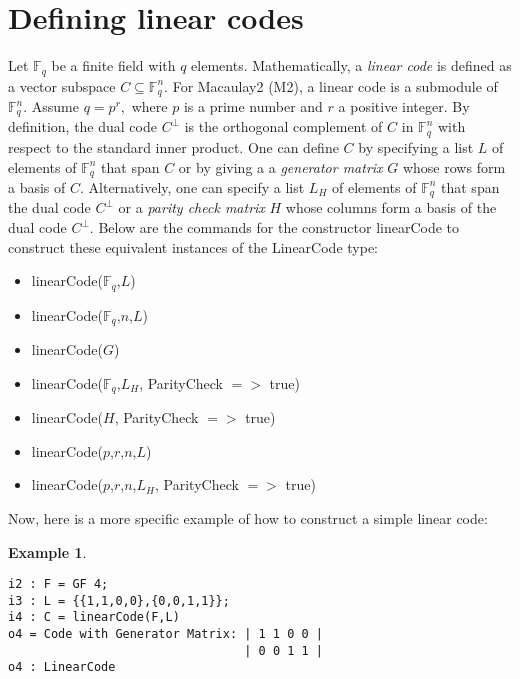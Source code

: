\documentclass[12pt]{amsart}
\theoremstyle{plain}
\newtheorem{example}[theorem]{Example}
\begin{document}
\section{Defining linear codes}\label{def}
Let $\mathbb{F}_q$ be a finite field with $q$ elements. Mathematically, a {\it linear code} is defined as a vector subspace $C\subseteq \mathbb{F}_q^n.$ For Macaulay2 (M2), a linear code is a submodule of $\mathbb{F}_q^n.$ Assume $q=p^r,$ where $p$ is a prime number and $r$ a positive integer. By definition, the dual code $C^\perp$ is the orthogonal complement of $C$ in $\mathbb{F}_q^n$ with respect to the standard inner product. One can define $C$ by specifying a list $L$ of elements of $\mathbb{F}_q^n$ that span $C$ or by giving a
a {\it generator matrix} $G$ whose rows form a basis of $C$. Alternatively, one can specify a list $L_{H}$ of elements of $\mathbb{F}_q^n$ that span the dual  code $C^\perp$ or a {\it parity check matrix} $H$ whose columns form a basis of the dual code $C^\perp$.
Below are the commands for the constructor linearCode to construct these equivalent instances of the LinearCode type:
\begin{itemize}
\item linearCode($\mathbb{F}_q$,$L$)
\item linearCode($\mathbb{F}_q$,$n$,$L$)
\item linearCode($G$)
\item linearCode($\mathbb{F}_q$,$L_H$, ParityCheck $=>$ true)
\item linearCode($H$, ParityCheck $=>$ true)
\item linearCode($p$,$r$,$n$,$L$)
\item linearCode($p$,$r$,$n$,$L_H$, ParityCheck $=>$ true)
\end{itemize}

Now, here is a more specific example of how to construct a simple linear code: 

\begin{example}
$\,$
\begin{verbatim}
i2 : F = GF 4;
i3 : L = {{1,1,0,0},{0,0,1,1}};
i4 : C = linearCode(F,L)
o4 = Code with Generator Matrix: | 1 1 0 0 |
                                 | 0 0 1 1 |
o4 : LinearCode
\end{verbatim}
\end{example}
\end{document}
